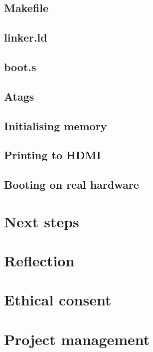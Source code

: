\documentclass[10pt,a4paper]{article}
\begin{document}
\subsection{Makefile}

\subsection{linker.ld}
\subsection{boot.s}
\subsection{Atags}
\subsection{Initialising memory}
\subsection{Printing to HDMI}
\subsection{Booting on real hardware}


\section{Next steps}

\section{Reflection}

\section{Ethical consent}

\section{Project management}



\appendix


\end{document}
